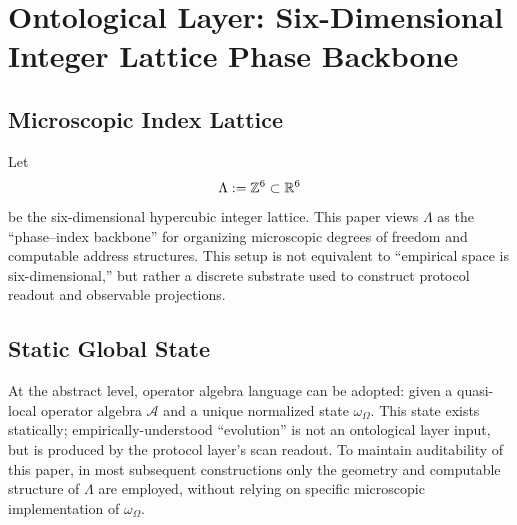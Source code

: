 \section{Ontological Layer: Six-Dimensional Integer Lattice Phase Backbone}

\subsection{Microscopic Index Lattice}

Let
\[
\Lambda := \mathbb{Z}^{6}\subset \mathbb{R}^{6}
\]
be the six-dimensional hypercubic integer lattice. This paper views $\Lambda$ as the ``phase--index backbone'' for organizing microscopic degrees of freedom and computable address structures. This setup is not equivalent to ``empirical space is six-dimensional,'' but rather a discrete substrate used to construct protocol readout and observable projections.

\subsection{Static Global State}

At the abstract level, operator algebra language can be adopted: given a quasi-local operator algebra $\mathcal{A}$ and a unique normalized state $\omega_{\Omega}$. This state exists statically; empirically-understood ``evolution'' is not an ontological layer input, but is produced by the protocol layer's scan readout. To maintain auditability of this paper, in most subsequent constructions only the geometry and computable structure of $\Lambda$ are employed, without relying on specific microscopic implementation of $\omega_{\Omega}$.
